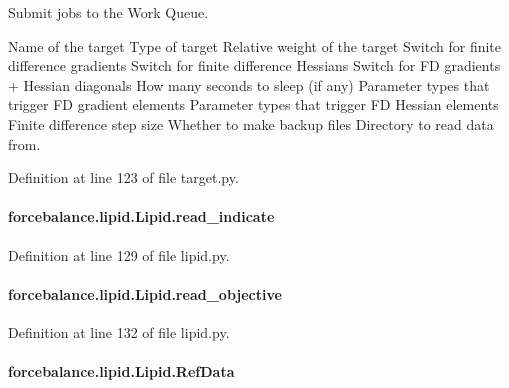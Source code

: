 Submit jobs to the Work Queue.

Name of the target Type of target Relative weight of the target Switch for finite difference gradients Switch for finite difference Hessians Switch for F\-D gradients + Hessian diagonals How many seconds to sleep (if any) Parameter types that trigger F\-D gradient elements Parameter types that trigger F\-D Hessian elements Finite difference step size Whether to make backup files Directory to read data from.

Definition at line 123 of file target.\-py.

\hypertarget{classforcebalance_1_1lipid_1_1Lipid_af5dfb680e8dc79f92c8e882f72f15559}{
\paragraph[{read\-\_\-indicate}]{\setlength{\rightskip}{0pt plus 5cm}forcebalance.\-lipid.\-Lipid.\-read\-\_\-indicate\hspace{0.3cm}{\ttfamily [inherited]}}}\label{classforcebalance_1_1lipid_1_1Lipid_af5dfb680e8dc79f92c8e882f72f15559}


Definition at line 129 of file lipid.\-py.

\hypertarget{classforcebalance_1_1lipid_1_1Lipid_a0edba63f8f5fbc3f8c51df153a886db9}{
\paragraph[{read\-\_\-objective}]{\setlength{\rightskip}{0pt plus 5cm}forcebalance.\-lipid.\-Lipid.\-read\-\_\-objective\hspace{0.3cm}{\ttfamily [inherited]}}}\label{classforcebalance_1_1lipid_1_1Lipid_a0edba63f8f5fbc3f8c51df153a886db9}


Definition at line 132 of file lipid.\-py.

\hypertarget{classforcebalance_1_1lipid_1_1Lipid_a68d0649454816e6f1eb121166ccc9e00}{
\paragraph[{Ref\-Data}]{\setlength{\rightskip}{0pt plus 5cm}forcebalance.\-lipid.\-Lipid.\-Ref\-Data\hspace{0.3cm}{\ttfamily [inherited]}}}\label{classforcebalance_1_1lipid_1_1Lipid_a68d0649454816e6f1eb121166ccc9e00}


